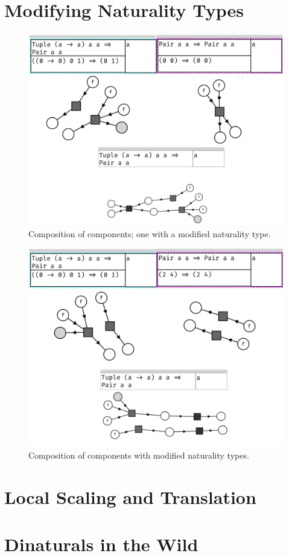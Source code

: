 \documentclass[11pt,openright,hidelinks,a4paper]{article}
\begin{document}
\section{Modifying Naturality Types}\label{app:modcomp}

\begin{figure}[H]
\begin{center}
\includegraphics[scale=0.45]{natcompose2}
\end{center}
\caption{Composition of components; one with a modified naturality type.}
\label{fig:natcompose}
\end{figure}

\begin{figure}[H]
\begin{center}
\includegraphics[scale=0.45]{natcompose}
\end{center}
\caption{Composition of components with modified naturality types.}
\label{fig:natcompose2}
\end{figure}

\section{Local Scaling and Translation}\label{app:zoomtrans}

\section{Dinaturals in the Wild}\label{app:wilddinaturals}
\end{document}
